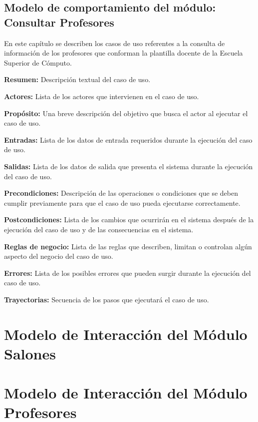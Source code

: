 
\subsection{Modelo de comportamiento del módulo: Consultar Profesores \label{chp:modeloComportamientoInformacionBase}}

En este capítulo se describen los casos de uso referentes a la consulta de información de los profesores que conforman la plantilla docente de la Escuela Superior de Cómputo. \bigskip

\begin{objetivos}
	\item {\bf Resumen:} Descripción textual del caso de uso.
	\item {\bf Actores:} Lista de los actores que intervienen en el caso de uso.
	\item {\bf Propósito:} Una breve descripción del objetivo que busca el actor al ejecutar el caso de uso.
	\item {\bf Entradas:} Lista de los datos de entrada requeridos durante la ejecución del caso de uso.
	\item {\bf Salidas:} Lista de los datos de salida que presenta el sistema durante la ejecución del caso de uso.
	\item {\bf Precondiciones:} Descripción de las operaciones o condiciones que se deben cumplir previamente para que el caso de uso pueda ejecutarse correctamente.
	\item {\bf Postcondiciones:} Lista de los cambios que ocurrirán en el sistema después de la ejecución del caso de uso y de las consecuencias en el sistema.
	\item {\bf Reglas de negocio:} Lista de las reglas que describen, limitan o controlan algún aspecto del negocio del caso de uso.
	\item {\bf Errores:} Lista de los posibles errores que pueden surgir durante la ejecución del caso de uso.
	\item {\bf Trayectorias:} Secuencia de los pasos que ejecutará el caso de uso.
\end{objetivos}


\section{Modelo de Interacción del Módulo Salones}
\section{Modelo de Interacción del Módulo Profesores}

